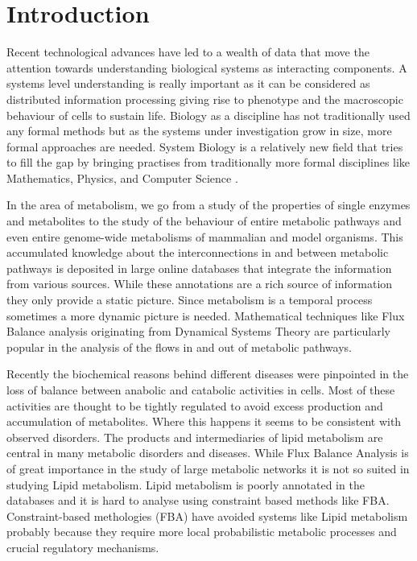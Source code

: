 

\chapter{Introduction}  %

\ifpdf
    \graphicspath{{Chapter1/Figs/Raster/}{Chapter1/Figs/PDF/}{Chapter1/Figs/}}
\else
    \graphicspath{{Chapter1/Figs/Vector/}{Chapter1/Figs/}}
\fi

Recent technological advances have led to a wealth of data that move
the attention towards understanding biological systems as interacting components.
A systems level understanding is really important
as it can be considered as distributed information processing giving rise to phenotype and the macroscopic
behaviour of cells to sustain life. Biology as a discipline has not traditionally used
any formal methods but as the systems under investigation grow in size,
more formal approaches are needed. System Biology is a relatively
new field that tries to fill the gap by bringing practises from
traditionally more formal disciplines like Mathematics, Physics, and
Computer Science \cite [] {ideker2001new}.

In the area of metabolism, we go from a study of the properties
of single enzymes and metabolites to the study of the behaviour of
entire metabolic pathways and even entire genome-wide metabolisms
of mammalian and model organisms. This accumulated knowledge about the
interconnections in and between metabolic pathways is deposited in
large online databases that integrate the information from various
sources. While these annotations are a rich source of information they
only provide a static picture.
Since metabolism is a temporal process sometimes a more dynamic
picture is needed. Mathematical techniques like Flux Balance analysis
originating from Dynamical Systems Theory are particularly popular in
the analysis of the flows in and out of metabolic pathways.

Recently the biochemical reasons behind
different diseases were pinpointed  in the loss of balance between anabolic and catabolic
activities in cells. Most of these activities are thought to be tightly
regulated to avoid excess production and accumulation of
metabolites. Where this happens it seems to be consistent with observed disorders. The products and
intermediaries of lipid metabolism are central in many metabolic
disorders and diseases. While Flux Balance
Analysis is of great importance in the study of large metabolic
networks it is not so suited in studying Lipid metabolism. Lipid
metabolism is poorly annotated in the databases and it is hard to
analyse using constraint based methods like FBA. Constraint-based
methologies (FBA) have avoided systems like Lipid metabolism
probably because they require more local probabilistic metabolic
processes and crucial regulatory mechanisms.

